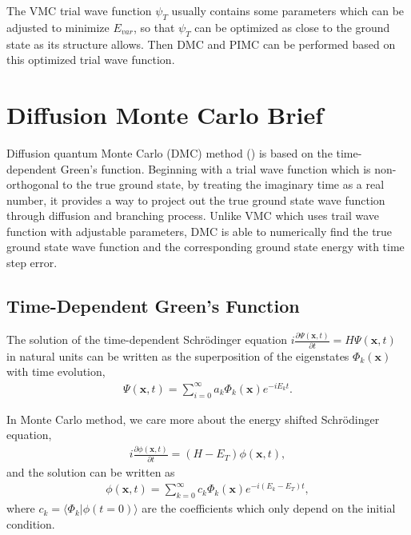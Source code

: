 \documentclass[12pt,letterpaper,UTF8]{report}
\begin{document}
{The VMC trial wave function $\psi_T$ usually contains some parameters which can be adjusted to minimize $E_{var}$, so that $\psi_T$ can be optimized as close to the ground state as its structure allows.
Then DMC and PIMC can be performed based on this optimized trial wave function.


\chapter{Diffusion Monte Carlo Brief}
\label{secDMC}
\clearpage
Diffusion quantum Monte Carlo (DMC) method (\cite{Negele1998Quantum,Kalosbook2008,HammondMCbook,VesaPDF}) is based on the time-dependent Green's function.
Beginning with a trial wave function which is non-orthogonal to the true ground state,
by treating the imaginary time as a real number, it provides a way to project out the true ground state wave function through diffusion and branching process. Unlike VMC which uses trail wave function with adjustable parameters, DMC is able to numerically find the true ground state wave function and the corresponding ground state energy with time step error.






\section{ Time-Dependent Green's Function}
The solution of the time-dependent Schr\"{o}dinger equation
$i \frac{\partial \Psi(\bm{x},t)}{\partial t}=H \Psi(\bm{x},t)$ in natural units can be written as the superposition of the eigenstates $\Phi_k(\bm{x})$ with time evolution,
\begin{eqnarray}
\Psi(\bm{x},t) = \sum_{i=0}^{\infty} a_k \Phi_k(\bm{x}) e^{-iE_k t}.
 \end{eqnarray}

In Monte Carlo method, we care more about the energy shifted Schr\"{o}dinger equation,
\begin{eqnarray}
i \frac{\partial \phi(\bm{x},t)}{\partial t}= (H-E_T) \phi(\bm{x},t), \label{dmcschtimesht}
 \end{eqnarray}
and the solution can be written as
\begin{eqnarray}
\phi(\bm{x},t) = \sum_{k=0}^{\infty} c_k \Phi_k(\bm{x}) e^{-i (E_k - E_T) t},
 \end{eqnarray}
where $c_k=\langle \Phi_k | \phi(t=0) \rangle$ are the coefficients which only depend on the initial condition.

}
\end{document}
